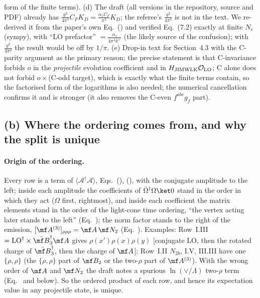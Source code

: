 form of the finite terms). (d) The draft (all versions in the repository, source and PDF) already has $\frac{g^2}{4\pi^3}C_FK_D=\frac{\alpha_sC_F}{\pi^2}K_D$; the referee's $\frac{g^2}{4\pi^4}$ is not in the text. We re-derived it from the paper's own Eq.~() and verified Eq.~(7.2) exactly at finite $N_c$ (sympy), with ``LO prefactor'' $=\frac{\alpha_s}{4\pi^4k^+}$ (the likely source of the confusion); with $\frac{g^2}{4\pi^4}$ the result would be off by $1/\pi$. (e) Drop-in text for Section~4.3 with the C-parity argument as the primary reason; the precise statement is that C-invariance forbids $o$ in the \emph{projectile} evolution coefficient and in $H_{\rm JIMWLK}\mathcal O_{\rm LO}$; C alone does not forbid $o\times$(C-odd target), which is exactly what the finite terms contain, so the factorised form of the logarithms is also needed; the numerical cancellation confirms it and is stronger (it also removes the C-even $f^{abc}g_f$ part).

\subsection{(b) Where the ordering comes from, and why the split is unique}\label{r3c:b}
\paragraph{Origin of the ordering.} Every row is a term of $\langle\mathcal A^\dagger\mathcal A\rangle$, Eqs.~(), (), with the conjugate amplitude to the left; inside each amplitude the coefficients of $\bar\Omega^\dagger\Omega\ket0$ stand in the order in which they act ($\Omega$ first, rightmost), and inside each coefficient the matrix elements stand in the order of the light-cone time ordering, ``the vertex acting later stands to the left'' (Eq.~); the norm factor stands to the right of the emission, $[\mf A^{(3)}]_{\rho\rho\rho}=\mf A\,\mf N_2$ (Eq.~). Examples: Row~I.III $=\mathrm{LO}^\dagger\times\bar{\mf B}_3^\dagger\mf A$ gives $\rho(x')\rho(x)\rho(y)$ [conjugate LO, then the rotated charge of $\bar{\mf B}_3^\dagger$, then the charge of $\mf A$]; Row~I.II $N_{2b}$, I.V, III.III have one $\{\rho,\rho\}$ (the $\{\rho,\rho\}$ part of $\mf B_2$ or the two-$\rho$ part of $\mf A^{(3)}$). With the wrong order of $\mf A$ and $\mf N_2$ the draft notes a spurious $\ln(\vee/\Lambda)$ two-$\rho$ term (Eq.~ and below). So the ordered product of each row, and hence its expectation value in any projectile state, is unique.
